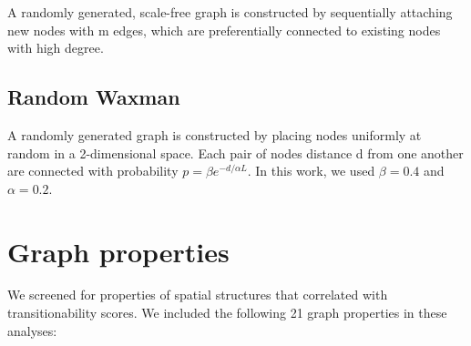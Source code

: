 \documentclass[
]{book}
\begin{document}
A randomly generated, scale-free graph is constructed by sequentially attaching new nodes with m edges, which are preferentially connected to existing nodes with high degree.

\hypertarget{random-waxman}{%
\section{Random Waxman}\label{random-waxman}}

A randomly generated graph is constructed by placing nodes uniformly at random in a 2-dimensional space.
Each pair of nodes distance d from one another are connected with probability \(p = \beta e^{-d/\alpha L}\).
In this work, we used \(\beta=0.4\) and \(\alpha=0.2\).

\hypertarget{graph-properties}{%
\chapter{Graph properties}\label{graph-properties}}

We screened for properties of spatial structures that correlated with transitionability scores.
We included the following 21 graph properties in these analyses:
\end{document}
